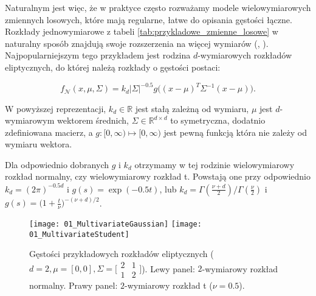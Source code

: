 Naturalnym jest więc, że w praktyce często rozważamy modele wielowymiarowych zmiennych losowych, które mają regularne, łatwe do opisania gęstości łączne. Rozkłady jednowymiarowe z tabeli \ref{tab:przykladowe_zmienne_losowe} w naturalny sposób znajdują swoje rozszerzenia na więcej wymiarów (\cite{MultivariateDistributions}, \cite{Cherubini_Copula_Methods_in_Finance}). Najpopularniejszym tego przykładem jest rodzina $d$-wymiarowych rozkładów eliptycznych, do której należą rozkłady o gęstości postaci:

$$ f_{\mathcal{N}}(x, \mu, \Sigma) = k_d \vert\Sigma\vert^{-0.5}g\big((x-\mu)^T\Sigma^{-1}(x-\mu)\big).$$

W powyższej reprezentacji, $k_d \in\mathbb{R}$ jest stałą zależną od wymiaru, $\mu$ jest $d$-wymiarowym wektorem średnich, $\Sigma \in \mathbb{R}^{d \times d}$ to symetryczna, dodatnio zdefiniowana macierz, a $g \colon [0, \infty) \mapsto [0, \infty)$ jest pewną funkcją która nie zależy od wymiaru wektora.

Dla odpowiednio dobranych $g$ i $k_d$ otrzymamy w tej rodzinie wielowymiarowy rozkład normalny, czy wielowymiarowy rozkład t. Powstają one przy odpowiednio $k_d=(2\pi)^{-0.5d}$ i $g(s) = \exp(-0.5 t)$, lub $k_d=\Gamma(\frac{\nu + d}{2})/\Gamma(\frac{\nu}{2})$ i $g(s) = \big(1 + \frac{t}{\nu})^{-(\nu + d)/2}$.
\begin{figure}[H]
	\centering
	\texttt{[image: 01\_MultivariateGaussian]}	\texttt{[image: 01\_MultivariateStudent]}
	\caption{Gęstości przykładowych rozkładów eliptycznych ($d=2, \mu=[0, 0], \Sigma = \big[\begin{smallmatrix}2&1\\1&2\end{smallmatrix}\big]$). Lewy panel: $2$-wymiarowy rozkład normalny. Prawy panel: $2$-wymiarowy rozkład t ($\nu = 0.5$).\label{fig:multivariate_gaussian_student}}
\end{figure}

